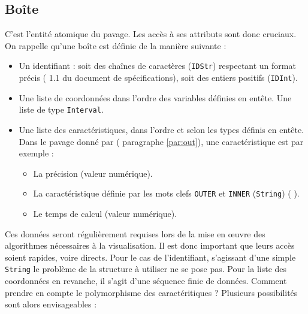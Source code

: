 \subsection{Boîte}
C'est l'entité atomique du pavage. Les accès à ses attributs sont donc cruciaux. On rappelle qu'une boîte est définie de la manière suivante : 
\begin{itemize}
\item 
  Un identifiant : soit des chaînes de caractères (\verb+IDStr+) respectant un format précis (\cf{} 1.1 du document de spécifications), soit des entiers positifs (\verb+IDInt+).
\item
  Une liste de coordonnées dans l'ordre des variables définies en entête. Une liste de type \verb+Interval+.
\item
  Une liste des caractéristiques, dans l'ordre et selon les types définis en entête. Dans le pavage donné par \realpaver{} (\cf{} paragraphe \ref{par:out}), une caractéristique est par exemple : 
  \begin{itemize}
\item La précision (valeur numérique).
\item La caractéristique définie par les mots clefs \verb+OUTER+ et \verb+INNER+ (\verb+String+) (\cf{} \cite{man}).
\item Le temps de calcul (valeur numérique).
  \end{itemize}
\end{itemize}
Ces données seront régulièrement requises lors de la mise en œuvre des algorithmes nécessaires à la visualisation. Il est donc important que leurs accès soient rapides, voire directs. Pour le cas de l'identifiant, s'agissant d'une simple \verb+String+ le problème de la structure à utiliser ne se pose pas. Pour la liste des coordonnées en revanche, il s'agit d'une séquence finie de données. {\color{red} Comment prendre en compte le polymorphisme des caractéritiques ? } Plusieurs possibilités sont alors envisageables : 

